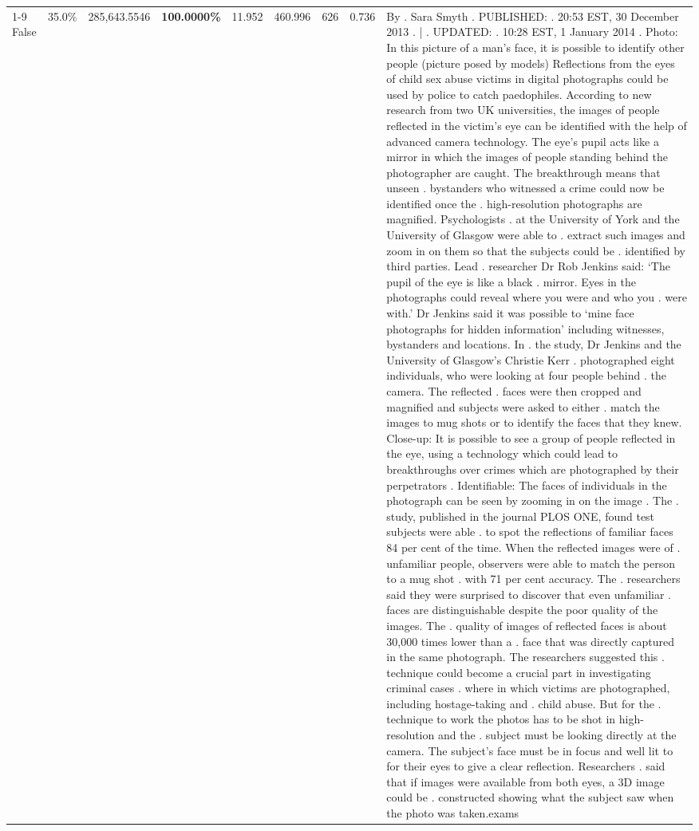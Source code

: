 \begin{table}[H]
\begin{tabular}{lllrlllll}
\cline{1-9}
False & 35.0\% & \color{red} 285,643.5546 & \bfseries \color{red} 100.0000\% & 11.952 & 460.996 & 626 & 0.736 & By . Sara Smyth . PUBLISHED: . 20:53 EST, 30 December 2013 . | . UPDATED: . 10:28 EST, 1 January 2014 . Photo: In this picture of a man's face, it is possible to identify other people (picture posed by models) Reflections from the eyes of child sex abuse victims in digital photographs could be used by police to catch paedophiles. According to new research from two UK universities, the images of people reflected in the victim's eye can be identified with the help of advanced camera technology. The eye's pupil acts like a mirror in which the images of people standing behind the photographer are caught. The breakthrough means that unseen . bystanders who witnessed a crime could now be identified once the . high-resolution photographs are magnified. Psychologists . at the University of York and the University of Glasgow were able to . extract such images and zoom in on them so that the subjects could be . identified by third parties. Lead . researcher Dr Rob Jenkins said: ‘The pupil of the eye is like a black . mirror. Eyes in the photographs could reveal where you were and who you . were with.' Dr Jenkins said it was possible to ‘mine face photographs for hidden information' including witnesses, bystanders and locations. In . the study, Dr Jenkins and the University of Glasgow's Christie Kerr . photographed eight individuals, who were looking at four people behind . the camera. The reflected . faces were then cropped and magnified and subjects were asked to either . match the images to mug shots or to identify the faces that they knew. Close-up: It is possible to see a group of people reflected in the eye, using a technology which could lead to breakthroughs over crimes which are photographed by their perpetrators . Identifiable: The faces of individuals in the photograph can be seen by zooming in on the image . The . study, published in the journal PLOS ONE, found test subjects were able . to spot the reflections of familiar faces 84 per cent of the time. When the reflected images were of . unfamiliar people, observers were able to match the person to a mug shot . with 71 per cent accuracy. The . researchers said they were surprised to discover that even unfamiliar . faces are distinguishable despite the poor quality of the images. The . quality of images of reflected faces is about 30,000 times lower than a . face that was directly captured in the same photograph. The researchers suggested this . technique could become a crucial part in investigating criminal cases . where in which victims are photographed, including hostage-taking and . child abuse. But for the . technique to work the photos has to be shot in high-resolution and the . subject must be looking directly at the camera. The subject's face must be in focus and well lit to for their eyes to give a clear reflection. Researchers . said that if images were available from both eyes, a 3D image could be . constructed showing what the subject saw when the photo was taken.exams \\

\end{tabular}
\end{table}
